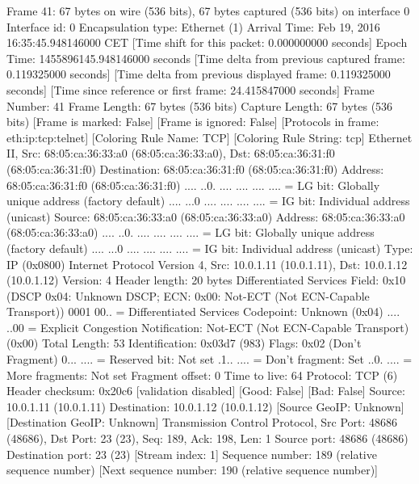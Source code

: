 Frame 41: 67 bytes on wire (536 bits), 67 bytes captured (536 bits) on interface 0
    Interface id: 0
    Encapsulation type: Ethernet (1)
    Arrival Time: Feb 19, 2016 16:35:45.948146000 CET
    [Time shift for this packet: 0.000000000 seconds]
    Epoch Time: 1455896145.948146000 seconds
    [Time delta from previous captured frame: 0.119325000 seconds]
    [Time delta from previous displayed frame: 0.119325000 seconds]
    [Time since reference or first frame: 24.415847000 seconds]
    Frame Number: 41
    Frame Length: 67 bytes (536 bits)
    Capture Length: 67 bytes (536 bits)
    [Frame is marked: False]
    [Frame is ignored: False]
    [Protocols in frame: eth:ip:tcp:telnet]
    [Coloring Rule Name: TCP]
    [Coloring Rule String: tcp]
Ethernet II, Src: 68:05:ca:36:33:a0 (68:05:ca:36:33:a0), Dst: 68:05:ca:36:31:f0 (68:05:ca:36:31:f0)
    Destination: 68:05:ca:36:31:f0 (68:05:ca:36:31:f0)
        Address: 68:05:ca:36:31:f0 (68:05:ca:36:31:f0)
        .... ..0. .... .... .... .... = LG bit: Globally unique address (factory default)
        .... ...0 .... .... .... .... = IG bit: Individual address (unicast)
    Source: 68:05:ca:36:33:a0 (68:05:ca:36:33:a0)
        Address: 68:05:ca:36:33:a0 (68:05:ca:36:33:a0)
        .... ..0. .... .... .... .... = LG bit: Globally unique address (factory default)
        .... ...0 .... .... .... .... = IG bit: Individual address (unicast)
    Type: IP (0x0800)
Internet Protocol Version 4, Src: 10.0.1.11 (10.0.1.11), Dst: 10.0.1.12 (10.0.1.12)
    Version: 4
    Header length: 20 bytes
    Differentiated Services Field: 0x10 (DSCP 0x04: Unknown DSCP; ECN: 0x00: Not-ECT (Not ECN-Capable Transport))
        0001 00.. = Differentiated Services Codepoint: Unknown (0x04)
        .... ..00 = Explicit Congestion Notification: Not-ECT (Not ECN-Capable Transport) (0x00)
    Total Length: 53
    Identification: 0x03d7 (983)
    Flags: 0x02 (Don't Fragment)
        0... .... = Reserved bit: Not set
        .1.. .... = Don't fragment: Set
        ..0. .... = More fragments: Not set
    Fragment offset: 0
    Time to live: 64
    Protocol: TCP (6)
    Header checksum: 0x20c6 [validation disabled]
        [Good: False]
        [Bad: False]
    Source: 10.0.1.11 (10.0.1.11)
    Destination: 10.0.1.12 (10.0.1.12)
    [Source GeoIP: Unknown]
    [Destination GeoIP: Unknown]
Transmission Control Protocol, Src Port: 48686 (48686), Dst Port: 23 (23), Seq: 189, Ack: 198, Len: 1
    Source port: 48686 (48686)
    Destination port: 23 (23)
    [Stream index: 1]
    Sequence number: 189    (relative sequence number)
    [Next sequence number: 190    (relative sequence number)]
